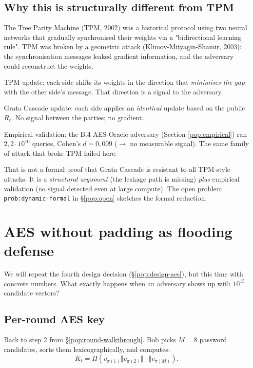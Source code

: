 \documentclass[11pt,a4paper]{article}
\begin{document}
\subsection{Why this is structurally different from TPM}

The Tree Parity Machine (TPM, 2002) was a historical protocol using two neural networks that gradually synchronised their weights via a "bidirectional learning rule". TPM was broken by a geometric attack (Klimov-Mityagin-Shamir, 2003): the synchronisation messages leaked gradient information, and the adversary could reconstruct the weights.

\begin{sidebar}
TPM update: each side shifts its weights in the direction that \emph{minimises the gap} with the other side's message. That direction is a signal to the adversary.

Grata Cascade update: each side applies an \emph{identical} update based on the public $R_t$. No signal between the parties; no gradient.

Empirical validation: the B.4 AES-Oracle adversary (Section \ref{pop:empirical}) ran $2{,}2 \cdot 10^{10}$ queries, Cohen's $d = 0{,}009$ ($\to$ no measurable signal). The same family of attack that broke TPM failed here.
\end{sidebar}

That is not a formal proof that Grata Cascade is resistant to all TPM-style attacks. It is a \emph{structural argument} (the leakage path is missing) \emph{plus} empirical validation (no signal detected even at large compute). The open problem \texttt{prob:dynamic-formal} in §\ref{pop:open} sketches the formal reduction.

\section{AES without padding as flooding defense}\label{pop:aes}

We will repeat the fourth design decision (§\ref{pop:design-aes}), but this time with concrete numbers. What exactly happens when an adversary shows up with $10^{15}$ candidate vectors?

\subsection{Per-round AES key}

Back to step 2 from §\ref{pop:round-walkthrough}. Bob picks $M = 8$ password candidates, sorts them lexicographically, and computes:
\[
K_t = H(v_{\pi(1)} \Vert v_{\pi(2)} \Vert \cdots \Vert v_{\pi(M)}).
\]
\end{document}
